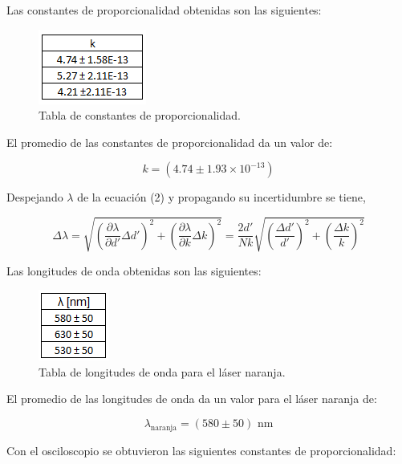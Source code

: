 \documentclass[DIV=calc, paper=a4, fontsize=10.5pt]{scrartcl}
\begin{document}
Las constantes de proporcionalidad obtenidas son las siguientes:

\begin{figure}[H]
    \centering
    \includegraphics{tablas/tabla 1.PNG}
    \caption{Tabla de constantes de proporcionalidad.}
    \label{fig:my_label}
\end{figure}

El promedio de las constantes de proporcionalidad  da un valor de:

\begin{equation*}
    k = (4.74 \pm 1.93\times 10^{-13})
\end{equation*}


Despejando $\lambda$ de la ecuación (2) y propagando su incertidumbre se tiene,

\begin{equation*}
    \Delta \lambda = \sqrt{ \left(\frac{\partial \lambda}{\partial d'} \Delta d'\right)^{2} + \left(\frac{\partial \lambda}{\partial k} \Delta k\right)^{2}} = \frac{2d'}{Nk} \sqrt{\left(\frac{\Delta  d'}{d'}\right)^{2} + \left(\frac{\Delta k}{k}\right)^{2}}
\end{equation*}

Las longitudes de onda obtenidas son las siguientes:

\begin{figure}[H]
    \centering
    \includegraphics{tablas/tabla 2.PNG}
    \caption{Tabla de longitudes de onda para el láser naranja.}
    \label{fig:my_label}
\end{figure}

El promedio de las longitudes de onda da un valor para el láser naranja de:

\begin{equation*}
    \lambda_{\text{naranja}} = (580 \pm 50) \text{ nm}
\end{equation*}

Con el osciloscopio se obtuvieron las siguientes constantes de proporcionalidad:
\end{document}
